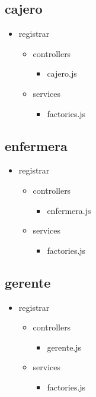 	\subsection{cajero}
	\begin{itemize}
		\item registrar
		\begin{itemize}
			\item controllers
			\begin{itemize}
				\item cajero.js
			\end{itemize}
			\item services
			\begin{itemize}
				\item factories.js
			\end{itemize}
		\end{itemize}
	\end{itemize}
	\subsection{enfermera}
		\begin{itemize}
		\item registrar
		\begin{itemize}
			\item controllers
			\begin{itemize}
				\item enfermera.js
			\end{itemize}
			\item services
			\begin{itemize}
				\item factories.js
			\end{itemize}
		\end{itemize}
	\end{itemize}
	\subsection{gerente}
		\begin{itemize}
		\item registrar
		\begin{itemize}
			\item controllers
			\begin{itemize}
				\item gerente.js
			\end{itemize}
			\item services
			\begin{itemize}
				\item factories.js
			\end{itemize}
		\end{itemize}
	\end{itemize}
